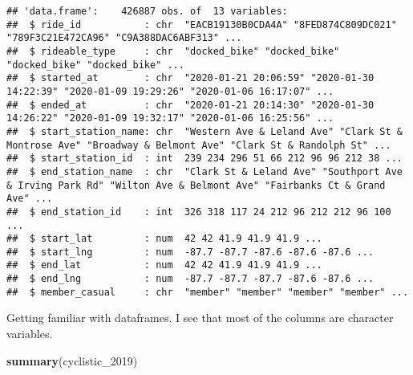 \documentclass[
]{article}
\newenvironment{Shaded}{\begin{snugshade}}{\end{snugshade}}
\newcommand{\FunctionTok}[1]{\textcolor[rgb]{0.13,0.29,0.53}{\textbf{#1}}}
\newcommand{\NormalTok}[1]{#1}
\begin{document}
\begin{verbatim}
## 'data.frame':    426887 obs. of  13 variables:
##  $ ride_id           : chr  "EACB19130B0CDA4A" "8FED874C809DC021" "789F3C21E472CA96" "C9A388DAC6ABF313" ...
##  $ rideable_type     : chr  "docked_bike" "docked_bike" "docked_bike" "docked_bike" ...
##  $ started_at        : chr  "2020-01-21 20:06:59" "2020-01-30 14:22:39" "2020-01-09 19:29:26" "2020-01-06 16:17:07" ...
##  $ ended_at          : chr  "2020-01-21 20:14:30" "2020-01-30 14:26:22" "2020-01-09 19:32:17" "2020-01-06 16:25:56" ...
##  $ start_station_name: chr  "Western Ave & Leland Ave" "Clark St & Montrose Ave" "Broadway & Belmont Ave" "Clark St & Randolph St" ...
##  $ start_station_id  : int  239 234 296 51 66 212 96 96 212 38 ...
##  $ end_station_name  : chr  "Clark St & Leland Ave" "Southport Ave & Irving Park Rd" "Wilton Ave & Belmont Ave" "Fairbanks Ct & Grand Ave" ...
##  $ end_station_id    : int  326 318 117 24 212 96 212 212 96 100 ...
##  $ start_lat         : num  42 42 41.9 41.9 41.9 ...
##  $ start_lng         : num  -87.7 -87.7 -87.6 -87.6 -87.6 ...
##  $ end_lat           : num  42 42 41.9 41.9 41.9 ...
##  $ end_lng           : num  -87.7 -87.7 -87.7 -87.6 -87.6 ...
##  $ member_casual     : chr  "member" "member" "member" "member" ...
\end{verbatim}

Getting familiar with dataframes. I see that most of the columns are
character variables.

\begin{Shaded}
\begin{Highlighting}[]
\FunctionTok{summary}\NormalTok{(cyclistic\_2019)}
\end{Highlighting}
\end{Shaded}
\end{document}
